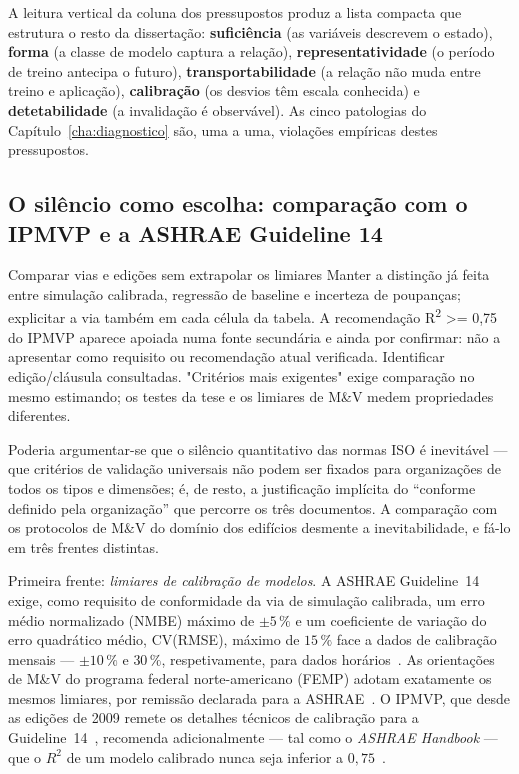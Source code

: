 A leitura vertical da coluna dos pressupostos produz a lista compacta que estrutura o resto da dissertação: \textbf{suficiência} (as variáveis descrevem o estado), \textbf{forma} (a classe de modelo captura a relação), \textbf{representatividade} (o período de treino antecipa o futuro), \textbf{transportabilidade} (a relação não muda entre treino e aplicação), \textbf{calibração} (os desvios têm escala conhecida) e \textbf{detetabilidade} (a invalidação é observável). As cinco patologias do Capítulo~\ref{cha:diagnostico} são, uma a uma, violações empíricas destes pressupostos.

\subsection{O silêncio como escolha: comparação com o IPMVP e a ASHRAE Guideline 14}
\label{sec:assimetria-comparacao}
{Comparar vias e edições sem extrapolar os limiares}
{Manter a distinção já feita entre simulação calibrada, regressão de
baseline e incerteza de poupanças; explicitar a via também em cada célula
da tabela. A recomendação R\textsuperscript{2} \textgreater{}= 0,75 do IPMVP aparece apoiada numa fonte
secundária e ainda por confirmar: não a apresentar como requisito ou
recomendação atual verificada. Identificar edição/cláusula consultadas.
"Critérios mais exigentes" exige comparação no mesmo estimando; os testes
da tese e os limiares de M\&V medem propriedades diferentes.}%

Poderia argumentar-se que o silêncio quantitativo das normas ISO é inevitável --- que critérios de validação universais não podem ser fixados para organizações de todos os tipos e dimensões; é, de resto, a justificação implícita do \enquote{conforme definido pela organização} que percorre os três documentos. A comparação com os protocolos de M\&V do domínio dos edifícios desmente a inevitabilidade, e fá-lo em três frentes distintas.

Primeira frente: \emph{limiares de calibração de modelos}. A ASHRAE Guideline~14 exige, como requisito de conformidade da via de simulação calibrada, um erro médio normalizado (NMBE) máximo de $\pm 5\,\%$ e um coeficiente de variação do erro quadrático médio, CV(RMSE), máximo de $15\,\%$ face a dados de calibração mensais --- $\pm 10\,\%$ e $30\,\%$, respetivamente, para dados horários~\cite[\S4.3.2.4\,f), \S5.3.3.3.10]{ASHRAE14_2014}. As orientações de M\&V do programa federal norte-americano (FEMP) adotam exatamente os mesmos limiares, por remissão declarada para a ASHRAE~\cite[\S4.5.3.2, Tabela~4-2]{FEMP_2015}. O IPMVP, que desde as edições de 2009 remete os detalhes técnicos de calibração para a Guideline~14~\cite{RuizBandera2017}, recomenda adicionalmente --- tal como o \emph{ASHRAE Handbook} --- que o $R^2$ de um modelo calibrado nunca seja inferior a $0{,}75$~\cite{RuizBandera2017}.

